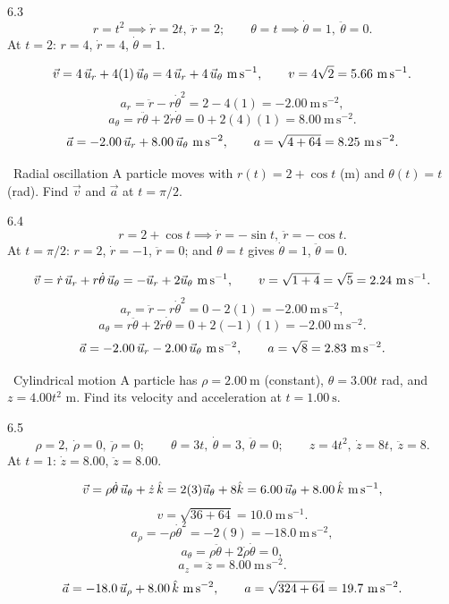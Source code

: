 \begin{tabletworkspace}[6.5cm]
\end{tabletworkspace}

\begin{solution}{6.3}
\[
r=t^2\implies \dot r=2t,\ \ddot r=2;\qquad
\theta=t\implies \dot\theta=1,\ \ddot\theta=0.
\]
At $t=2$: $r=4$, $\dot r=4$, $\dot\theta=1$.

\[
\vec v=4\,\ur+4(1)\,\ut=4\,\ur+4\,\ut\ \mathrm{m\,s^{-1}},
\qquad v=4\sqrt2=5.66\ \mathrm{m\,s^{-1}}.
\]
\[
a_r=\ddot r-r\dot\theta^2=2-4(1)=-2.00\ \mathrm{m\,s^{-2}},
\]
\[
a_\theta=r\ddot\theta+2\dot r\dot\theta=0+2(4)(1)=8.00\ \mathrm{m\,s^{-2}}.
\]
\[
\vec a=-2.00\,\ur+8.00\,\ut\ \mathrm{m\,s^{-2}},
\qquad a=\sqrt{4+64}=8.25\ \mathrm{m\,s^{-2}}.
\]
\end{solution}

\begin{exercise}{\core\ Radial oscillation}
A particle moves with $r(t)=2+\cos t$ (m) and $\theta(t)=t$ (rad). Find
$\vec v$ and $\vec a$ at $t=\pi/2$.
\end{exercise}

\begin{tabletworkspace}[6.5cm]
\end{tabletworkspace}

\begin{solution}{6.4}
\[
r=2+\cos t\implies \dot r=-\sin t,\ \ddot r=-\cos t.
\]
At $t=\pi/2$: $r=2$, $\dot r=-1$, $\ddot r=0$; and $\theta=t$ gives
$\dot\theta=1$, $\ddot\theta=0$.

\[
\vec v=\dot r\,\vec{u}_r+r\dot\theta\,\vec{u}_\theta=-\vec{u}_r+2\vec{u}_\theta\ \mathrm{m\,s^{-1}},
\qquad v=\sqrt{1+4}=\sqrt5=2.24\ \mathrm{m\,s^{-1}}.
\]
\[
a_r=\ddot r-r\dot\theta^2=0-2(1)=-2.00\ \mathrm{m\,s^{-2}},
\]
\[
a_\theta=r\ddot\theta+2\dot r\dot\theta=0+2(-1)(1)=-2.00\ \mathrm{m\,s^{-2}}.
\]
\[
\vec a=-2.00\,\ur-2.00\,\ut\ \mathrm{m\,s^{-2}},
\qquad a=\sqrt{8}=2.83\ \mathrm{m\,s^{-2}}.
\]
\end{solution}

\begin{exercise}{\core\ Cylindrical motion}
A particle has $\rho=2.00\ \mathrm{m}$ (constant), $\theta=3.00t$ rad, and
$z=4.00t^2$ m. Find its velocity and acceleration at $t=1.00\ \mathrm{s}$.
\end{exercise}

\begin{tabletworkspace}[6.5cm]
\end{tabletworkspace}

\begin{solution}{6.5}
\[
\rho=2,\ \dot\rho=0,\ \ddot\rho=0;\qquad
\theta=3t,\ \dot\theta=3,\ \ddot\theta=0;\qquad
z=4t^2,\ \dot z=8t,\ \ddot z=8.
\]
At $t=1$: $\dot z=8.00$, $\ddot z=8.00$.

\[
\vec v=\rho\dot\theta\,\vec u_\theta+\dot z\,\khat
=2(3)\vec u_\theta+8\khat=6.00\,\vec u_\theta+8.00\,\khat\ \mathrm{m\,s^{-1}},
\]
\[
v=\sqrt{36+64}=10.0\ \mathrm{m\,s^{-1}}.
\]
\[
a_\rho=-\rho\dot\theta^2=-2(9)=-18.0\ \mathrm{m\,s^{-2}},
\]
\[
a_\theta=\rho\ddot\theta+2\dot\rho\dot\theta=0,
\]
\[
a_z=\ddot z=8.00\ \mathrm{m\,s^{-2}}.
\]
\[
\vec a=-18.0\,\vec u_\rho+8.00\,\khat\ \mathrm{m\,s^{-2}},
\qquad a=\sqrt{324+64}=19.7\ \mathrm{m\,s^{-2}}.
\]
\end{solution}

